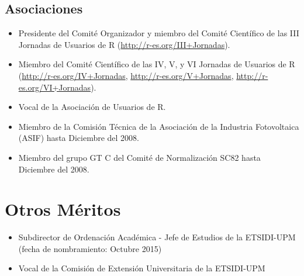 \documentclass[article, a4paper]{memoir}
\begin{document}
\subsection{Asociaciones}
\label{sec-15-4}

\begin{itemize}
\item Presidente del Comité Organizador y miembro del Comité Científico de las III Jornadas de Usuarios de R (\url{http://r-es.org/III+Jornadas}).

\item Miembro del Comité Científico de las IV, V, y VI Jornadas de Usuarios de R (\url{http://r-es.org/IV+Jornadas}, \url{http://r-es.org/V+Jornadas}, \url{http://r-es.org/VI+Jornadas}).

\item Vocal de la Asociación de Usuarios de R.

\item Miembro de la Comisión Técnica de la Asociación de la Industria Fotovoltaica (ASIF) hasta Diciembre del 2008.

\item Miembro del grupo GT C del Comité de Normalización SC82 hasta Diciembre del 2008.
\end{itemize}

\section{Otros Méritos}
\label{sec-16}
\begin{itemize}
\item Subdirector de Ordenación Académica - Jefe de Estudios de la ETSIDI-UPM (fecha de nombramiento: Octubre 2015)
\item Vocal de la Comisión de Extensión Universitaria de la ETSIDI-UPM
\end{itemize}
\end{document}
